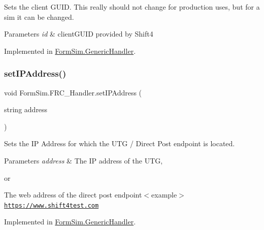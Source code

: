 Sets the client G\+U\+ID. This really should not change for production uses, but for a sim it can be changed. 


\begin{DoxyParams}{Parameters}
{\em id} & client\+G\+U\+ID provided by Shift4\\
\hline
\end{DoxyParams}


Implemented in \mbox{\hyperlink{class_form_sim_1_1_generic_handler_a3c934d9ba3f0efaadac331502ce0189c}{Form\+Sim.\+Generic\+Handler}}.

\mbox{\label{interface_form_sim_1_1_f_r_c___handler_a702c2593fce6995a49f0fb509a2c7605}} 
\subsubsection{\texorpdfstring{set\+I\+P\+Address()}{setIPAddress()}}
{\footnotesize\ttfamily void Form\+Sim.\+F\+R\+C\+\_\+\+Handler.\+set\+I\+P\+Address (\begin{DoxyParamCaption}\item[{string}]{address }\end{DoxyParamCaption})}



Sets the IP Address for which the U\+TG / Direct Post endpoint is located. 


\begin{DoxyParams}{Parameters}
{\em address} & The IP address of the U\+TG, \\
\hline
\end{DoxyParams}
or

The web address of the direct post endpoint$<$example$>$\href{https://www.shift4test.com}{\tt https\+://www.\+shift4test.\+com}

Implemented in \mbox{\hyperlink{class_form_sim_1_1_generic_handler_a7fa7f097410ae531b30fc6f257bcb393}{Form\+Sim.\+Generic\+Handler}}.

\mbox{\label{interface_form_sim_1_1_f_r_c___handler_a23a2917fb9455954723cd3982b31b76c}} 
